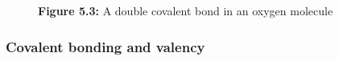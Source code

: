 {\begin{mdframed}[linewidth=4, leftmargin=40, rightmargin=40]
\begin{exercise}
\begin{enumerate}[noitemsep, label=\textbf{Step} \textbf{\arabic*}. ]
\begin{figure}[H]
\begin{center}
      \vspace{2pt}
    \vspace{\rubberspace}\par \begin{cnxcaption}
	  \small \textbf{Figure 5.3: }A double covalent bond in an oxygen molecule
	\end{cnxcaption}
    \vspace{.1in}
    \end{center}
 \end{figure}       
        \end{enumerate}
    \end{exercise}
    \end{mdframed}
    }
    \noindent
\label{m38704*secfhsst!!!underscore!!!id172}
            \subsubsection{  Covalent bonding and valency
        }
            \nopagebreak
